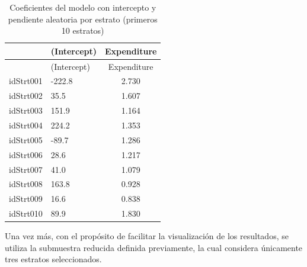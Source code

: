 \documentclass[
  spanish,
  12pt,
]{book}
\newenvironment{Shaded}{\begin{snugshade}}{\end{snugshade}}
\newcommand{\AttributeTok}[1]{\textcolor[rgb]{0.13,0.29,0.53}{#1}}
\newcommand{\DataTypeTok}[1]{\textcolor[rgb]{0.13,0.29,0.53}{#1}}
\newcommand{\DecValTok}[1]{\textcolor[rgb]{0.00,0.00,0.81}{#1}}
\newcommand{\FunctionTok}[1]{\textcolor[rgb]{0.13,0.29,0.53}{\textbf{#1}}}
\newcommand{\NormalTok}[1]{#1}
\newcommand{\OtherTok}[1]{\textcolor[rgb]{0.56,0.35,0.01}{#1}}
\newcommand{\SpecialCharTok}[1]{\textcolor[rgb]{0.81,0.36,0.00}{\textbf{#1}}}
\newcommand{\StringTok}[1]{\textcolor[rgb]{0.31,0.60,0.02}{#1}}
\begin{document}
\begin{Shaded}
\end{Shaded}

\begin{longtable}[]{@{}llc@{}}
\caption{\label{tab:tab-coef-pendiente-aleatoria}Coeficientes del modelo con intercepto y pendiente aleatoria por estrato (primeros 10 estratos)}\tabularnewline
\toprule\noalign{}
& (Intercept) & Expenditure \\
\midrule\noalign{}
\endfirsthead
\toprule\noalign{}
& (Intercept) & Expenditure \\
\midrule\noalign{}
\endhead
\bottomrule\noalign{}
\endlastfoot
idStrt001 & -222.8 & 2.730 \\
idStrt002 & 35.5 & 1.607 \\
idStrt003 & 151.9 & 1.164 \\
idStrt004 & 224.2 & 1.353 \\
idStrt005 & -89.7 & 1.286 \\
idStrt006 & 28.6 & 1.217 \\
idStrt007 & 41.0 & 1.079 \\
idStrt008 & 163.8 & 0.928 \\
idStrt009 & 16.6 & 0.838 \\
idStrt010 & 89.9 & 1.830 \\
\end{longtable}

Una vez más, con el propósito de facilitar la visualización de los resultados, se utiliza la submuestra reducida definida previamente, la cual considera únicamente tres estratos seleccionados.

\begin{Shaded}
\end{Shaded}
\end{document}
